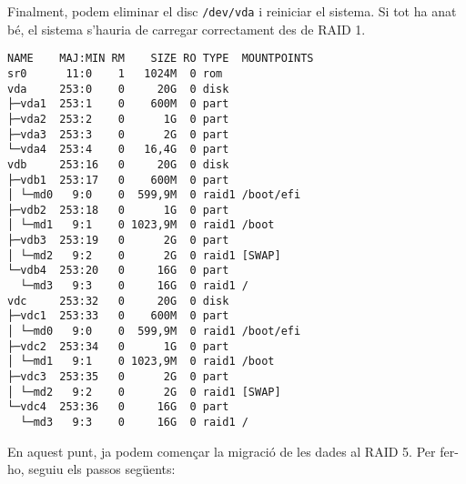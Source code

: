 Finalment, podem eliminar el disc \texttt{/dev/vda} i reiniciar el sistema. Si tot ha anat bé, el sistema s'hauria de carregar correctament des de RAID 1.

\begin{terminaloutput}
\footnotesize\begin{verbatim}
NAME    MAJ:MIN RM    SIZE RO TYPE  MOUNTPOINTS
sr0      11:0    1   1024M  0 rom
vda     253:0    0     20G  0 disk
├─vda1  253:1    0    600M  0 part
├─vda2  253:2    0      1G  0 part
├─vda3  253:3    0      2G  0 part
└─vda4  253:4    0   16,4G  0 part
vdb     253:16   0     20G  0 disk
├─vdb1  253:17   0    600M  0 part
│ └─md0   9:0    0  599,9M  0 raid1 /boot/efi
├─vdb2  253:18   0      1G  0 part
│ └─md1   9:1    0 1023,9M  0 raid1 /boot
├─vdb3  253:19   0      2G  0 part
│ └─md2   9:2    0      2G  0 raid1 [SWAP]
└─vdb4  253:20   0     16G  0 part
  └─md3   9:3    0     16G  0 raid1 /
vdc     253:32   0     20G  0 disk
├─vdc1  253:33   0    600M  0 part
│ └─md0   9:0    0  599,9M  0 raid1 /boot/efi
├─vdc2  253:34   0      1G  0 part
│ └─md1   9:1    0 1023,9M  0 raid1 /boot
├─vdc3  253:35   0      2G  0 part
│ └─md2   9:2    0      2G  0 raid1 [SWAP]
└─vdc4  253:36   0     16G  0 part
  └─md3   9:3    0     16G  0 raid1 /
\end{verbatim}
\end{terminaloutput}

En aquest punt, ja podem començar la migració de les dades al RAID 5. Per fer-ho, seguiu els passos següents:

